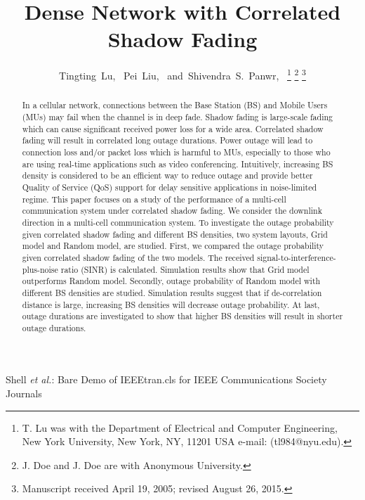 \documentclass[journal,comsoc]{IEEEtran}
\begin{document}
\title{Dense Network with Correlated Shadow Fading}
%
%
%




\author{Tingting~Lu,~
        Pei~Liu,~
        and~Shivendra~S.~Panwr,~%
\thanks{T. Lu was with the Department
of Electrical and Computer Engineering, New York University, New York,
NY, 11201 USA e-mail: (tl984@nyu.edu).}%
\thanks{J. Doe and J. Doe are with Anonymous University.}%
\thanks{Manuscript received April 19, 2005; revised August 26, 2015.}}

%
{Shell \MakeLowercase{\textit{et al.}}: Bare Demo of IEEEtran.cls for IEEE Communications Society Journals}
\maketitle
\begin{abstract}
In a cellular network, connections between the Base Station (BS) and Mobile Users (MUs) may fail when the channel is in deep fade. Shadow fading is large-scale fading which can cause significant received power loss for a wide area. Correlated shadow fading will result in correlated long outage durations. Power outage will lead to connection loss and/or packet loss which is harmful to MUs, especially to those who are using real-time applications such as video conferencing. Intuitively, increasing BS density is considered to be an efficient way to reduce outage and provide better Quality of Service (QoS) support for delay sensitive applications in noise-limited regime. This paper focuses on a study of the performance of a multi-cell communication system under correlated shadow fading. We consider the downlink direction in a multi-cell communication system. To investigate the outage probability given correlated shadow fading and different BS densities, two system layouts, Grid model and Random model, are studied. First, we compared the outage probability given correlated shadow fading of the two models. The received signal-to-interference-plus-noise ratio (SINR) is calculated. Simulation results show that Grid model outperforms Random model. Secondly, outage probability of Random model with different BS densities are studied. Simulation results suggest that if de-correlation distance is large, increasing BS densities will decrease outage probability. At last, outage durations are investigated to show that higher BS densities will result in shorter outage durations.
\end{abstract}
\end{document}
